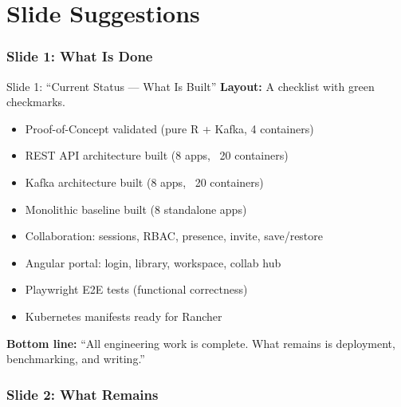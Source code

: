 \documentclass[12pt,a4paper]{article}
\begin{document}
\newpage

\part{Slide Suggestions}

\section{Slide 1: What Is Done}

\begin{slidebox}{Slide 1: ``Current Status --- What Is Built''}
\textbf{Layout:} A checklist with green checkmarks.

\begin{itemize}[nosep]
  \item[$\checkmark$] Proof-of-Concept validated (pure R + Kafka, 4 containers)
  \item[$\checkmark$] REST API architecture built (8 apps, ~20 containers)
  \item[$\checkmark$] Kafka architecture built (8 apps, ~20 containers)
  \item[$\checkmark$] Monolithic baseline built (8 standalone apps)
  \item[$\checkmark$] Collaboration: sessions, RBAC, presence, invite, save/restore
  \item[$\checkmark$] Angular portal: login, library, workspace, collab hub
  \item[$\checkmark$] Playwright E2E tests (functional correctness)
  \item[$\checkmark$] Kubernetes manifests ready for Rancher
\end{itemize}

\textbf{Bottom line:} ``All engineering work is complete. What remains is deployment, benchmarking, and writing.''
\end{slidebox}

\section{Slide 2: What Remains}
\end{document}
